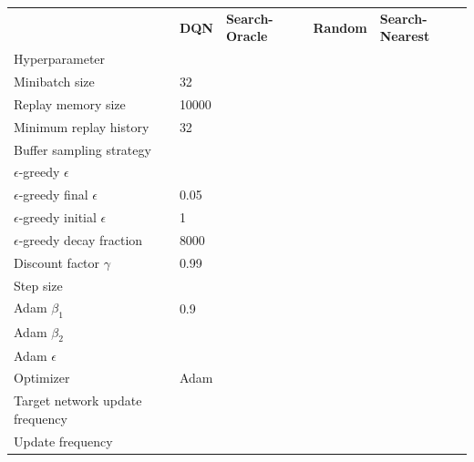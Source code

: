 \begin{tabular}{lllll}
 & \bfseries DQN & \bfseries Search-Oracle & \bfseries Random & \bfseries Search-Nearest \\
Hyperparameter &  &  &  &  \\
Minibatch size & 32 &  &  &  \\
Replay memory size & 10000 &  &  &  \\
Minimum replay history & 32 &  &  &  \\
Buffer sampling strategy &  &  &  &  \\
$\epsilon$-greedy $\epsilon$ &  &  &  &  \\
$\epsilon$-greedy final $\epsilon$ & 0.05 &  &  &  \\
$\epsilon$-greedy initial $\epsilon$ & 1 &  &  &  \\
$\epsilon$-greedy decay fraction & 8000 &  &  &  \\
Discount factor $\gamma$ & 0.99 &  &  &  \\
Step size &  &  &  &  \\
Adam $\beta_1$ & 0.9 &  &  &  \\
Adam $\beta_2$ &  &  &  &  \\
Adam $\epsilon$ &  &  &  &  \\
Optimizer & Adam &  &  &  \\
Target network update frequency &  &  &  &  \\
Update frequency &  &  &  &  \\
\end{tabular}
